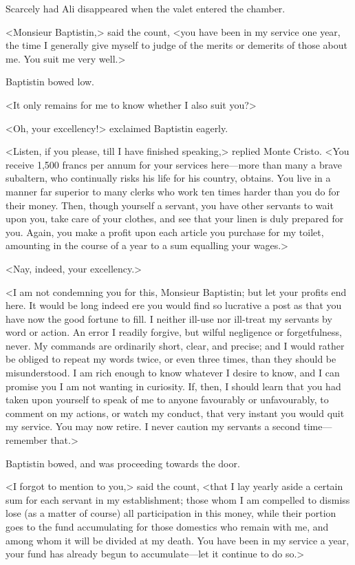  Scarcely had Ali disappeared when the valet entered the chamber. 

 <Monsieur Baptistin,> said the count, <you have been in my service one year, the time I generally give myself to judge of the merits or demerits of those about me. You suit me very well.> 

 Baptistin bowed low. 

 <It only remains for me to know whether I also suit you?> 

 <Oh, your excellency!> exclaimed Baptistin eagerly. 

 <Listen, if you please, till I have finished speaking,> replied Monte Cristo. <You receive 1,500 francs per annum for your services here—more than many a brave subaltern, who continually risks his life for his country, obtains. You live in a manner far superior to many clerks who work ten times harder than you do for their money. Then, though yourself a servant, you have other servants to wait upon you, take care of your clothes, and see that your linen is duly prepared for you. Again, you make a profit upon each article you purchase for my toilet, amounting in the course of a year to a sum equalling your wages.> 

 <Nay, indeed, your excellency.> 

 <I am not condemning you for this, Monsieur Baptistin; but let your profits end here. It would be long indeed ere you would find so lucrative a post as that you have now the good fortune to fill. I neither ill-use nor ill-treat my servants by word or action. An error I readily forgive, but wilful negligence or forgetfulness, never. My commands are ordinarily short, clear, and precise; and I would rather be obliged to repeat my words twice, or even three times, than they should be misunderstood. I am rich enough to know whatever I desire to know, and I can promise you I am not wanting in curiosity. If, then, I should learn that you had taken upon yourself to speak of me to anyone favourably or unfavourably, to comment on my actions, or watch my conduct, that very instant you would quit my service. You may now retire. I never caution my servants a second time—remember that.> 

 Baptistin bowed, and was proceeding towards the door. 

 <I forgot to mention to you,> said the count, <that I lay yearly aside a certain sum for each servant in my establishment; those whom I am compelled to dismiss lose (as a matter of course) all participation in this money, while their portion goes to the fund accumulating for those domestics who remain with me, and among whom it will be divided at my death. You have been in my service a year, your fund has already begun to accumulate—let it continue to do so.> 

